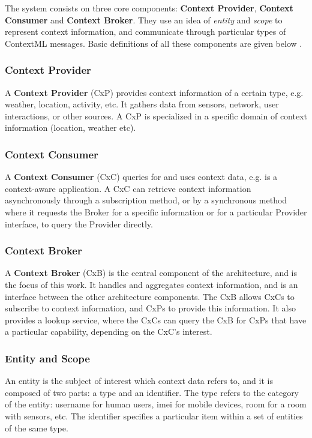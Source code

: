The system consists on three core components: \textbf{Context Provider}, \textbf{Context Consumer} and \textbf{Context Broker}. They use an idea of \textit{entity} and \textit{scope} to represent context information, and communicate through particular types of ContextML messages. Basic definitions of all these components are given below \cite{knappmeyer2010contextml}.

\subsubsection{Context Provider}
A \textbf{Context Provider} (CxP) provides context information of a certain type, e.g. weather, location, activity, etc. It gathers data from sensors, network, user interactions, or other sources. A CxP is specialized in a specific domain of context information (location, weather etc).


\subsubsection{Context Consumer}
A \textbf{Context Consumer} (CxC) queries for and uses context data, e.g. is a context-aware application. A CxC can retrieve context information asynchronously through a subscription method, or by a synchronous method where it requests the Broker for a specific information or for a particular Provider interface, to query the Provider directly.

\subsubsection{Context Broker}
A \textbf{Context Broker} (CxB) is the central component of the architecture, and is the focus of this work. It handles and aggregates context information, and is an interface between the other architecture components. The CxB allows CxCs to subscribe to context information, and CxPs to provide this information. It also provides a lookup service, where the CxCs can query the CxB for CxPs that have a particular capability, depending on the CxC’s interest.

\subsubsection{Entity and Scope}
An entity is the subject of interest which context data refers to, and it is composed of two parts: a type and an identifier. The type refers to the category of the entity: username for human users, imei for mobile devices, room for a room with sensors, etc. The identifier specifies a particular item within a set of entities of the same type.

